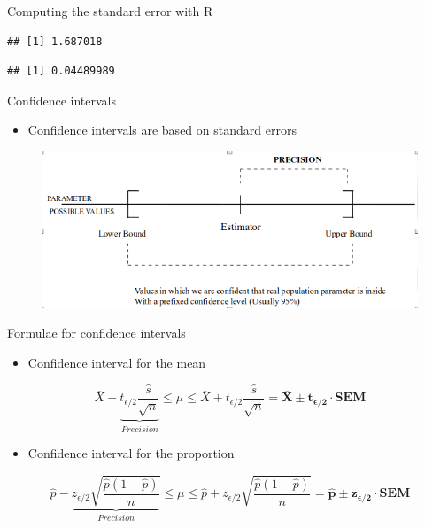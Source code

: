 \documentclass[
  ignorenonframetext,
]{beamer}
\newenvironment{Shaded}{\begin{snugshade}}{\end{snugshade}}
\newcommand{\DecValTok}[1]{\textcolor[rgb]{0.00,0.00,0.81}{#1}}
\newcommand{\FunctionTok}[1]{\textcolor[rgb]{0.00,0.00,0.00}{#1}}
\newcommand{\NormalTok}[1]{#1}
\newcommand{\OtherTok}[1]{\textcolor[rgb]{0.56,0.35,0.01}{#1}}
\newcommand{\SpecialCharTok}[1]{\textcolor[rgb]{0.00,0.00,0.00}{#1}}
\newcommand{\StringTok}[1]{\textcolor[rgb]{0.31,0.60,0.02}{#1}}
\providecommand{\tightlist}{%
  \setlength{\itemsep}{0pt}\setlength{\parskip}{0pt}}
\begin{document}
\begin{frame}[fragile]{Computing the standard error with R}
\begin{verbatim}
## [1] 1.687018
\end{verbatim}

\begin{Shaded}
\end{Shaded}

\begin{verbatim}
## [1] 0.04489989
\end{verbatim}
\end{frame}

\begin{frame}{Confidence intervals}
\protect\hypertarget{confidence-intervals}{}
\begin{itemize}
\tightlist
\item
  Confidence intervals are based on standard errors
\end{itemize}

\begin{figure}
\includegraphics[width=0.8\linewidth]{images/confidenceintervals1} \end{figure}
\end{frame}

\begin{frame}{Formulae for confidence intervals}
\protect\hypertarget{formulae-for-confidence-intervals}{}
\begin{itemize}
\tightlist
\item
  Confidence interval for the mean
\end{itemize}

\[
\overline{X} - \underbrace{t_{\epsilon/2} \frac{\hat s}{\sqrt{n}}}_{Precision} \leq \mu \leq
\overline{X} + t_{\epsilon/2} \frac{\hat s}{\sqrt{n}} = 
\mathbf{\overline{X} \pm t_{\epsilon/2} \cdot \mbox{SEM}}
\]

\begin{itemize}
\tightlist
\item
  Confidence interval for the proportion
\end{itemize}

\[
\hat {p} - \underbrace{z_{\epsilon/2} \sqrt{\frac{\hat p (1-\hat p)}{n}}}_{Precision} \leq \mu \leq
\hat {p} + z_{\epsilon/2} \sqrt{\frac{\hat p (1-\hat p)}{n}} = 
\mathbf{\hat {p} \pm z_{\epsilon/2} \cdot \mbox{SEM}}
\]
\end{frame}
\end{document}

